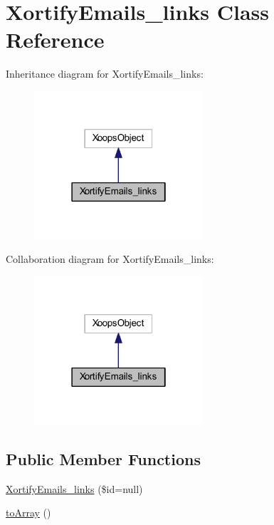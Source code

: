 \hypertarget{class_xortify_emails__links}{\section{Xortify\-Emails\-\_\-links Class Reference}
\label{class_xortify_emails__links}
}


Inheritance diagram for Xortify\-Emails\-\_\-links\-:
\nopagebreak
\begin{figure}[H]
\begin{center}
\leavevmode
\includegraphics[width=178pt]{class_xortify_emails__links__inherit__graph}
\end{center}
\end{figure}


Collaboration diagram for Xortify\-Emails\-\_\-links\-:
\nopagebreak
\begin{figure}[H]
\begin{center}
\leavevmode
\includegraphics[width=178pt]{class_xortify_emails__links__coll__graph}
\end{center}
\end{figure}
\subsection*{Public Member Functions}
\begin{DoxyCompactItemize}
\item 
\hyperlink{class_xortify_emails__links_a92acc301077c8e3b54e83301b2f20861}{Xortify\-Emails\-\_\-links} (\$id=null)
\item 
\hyperlink{class_xortify_emails__links_a658defb34762c8f40085aec87e16ba1a}{to\-Array} ()
\end{DoxyCompactItemize}


